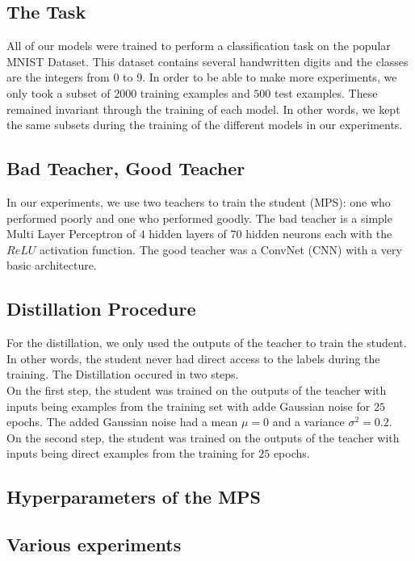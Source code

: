 \documentclass{article}
\theoremstyle{definition}
\theoremstyle{definition}
\begin{document}
\subsection{The Task}
All of our models were trained to perform a classification task on the popular MNIST Dataset. This dataset contains several handwritten digits and the classes are the integers from $0$ to $9$. In order to be able to make more experiments, we only took a subset of $2000$ training examples and $500$ test examples. These remained invariant through the training of each model. In other words, we kept the same subsets during the training of the different models in our experiments.

\subsection{Bad Teacher, Good Teacher}
In our experiments, we use two teachers to train the student (MPS): one who performed poorly and one who performed goodly.
The bad teacher is a simple Multi Layer Perceptron of $4$ hidden layers of $70$ hidden neurons each with the $ReLU$ activation function.  The good teacher was a ConvNet (CNN) with a very basic architecture. 

\subsection{Distillation Procedure}
For the distillation, we only used the outputs of the teacher to train the student. In other words, the student never had direct access to the labels during the training. The Distillation occured in two steps. \\ On the first step, the student was trained on the outputs of the teacher with inputs being examples from the training set with adde Gaussian noise for $25$ epochs. The added Gaussian noise had a mean $\mu=0$ and a variance $\sigma^2=0.2$. \\ On the second step, the student was trained on the outputs of the teacher with inputs being direct examples from the training for $25$ epochs.

\subsection{Hyperparameters of the MPS}

\subsection{Various experiments}
\end{document}
